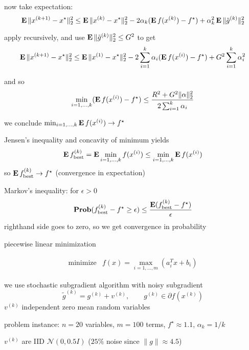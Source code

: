 \documentclass[dvips,landscape]{foils}
\renewcommand{\oursection}[1]{
\foilhead[-1.0cm]{#1}
}
\begin{document}
\newpage
now take expectation:
\[
\mathop{\bf E{}} \|x^{(k+1)}-x^\star\|_2^2
\leq \mathop{\bf E{}} \|x^{(k)}-x^\star\|_2^2
            -2\alpha_k (\mathop{\bf E{}} f(x^{(k)})-f^\star)
            +\alpha_k^2 \mathop{\bf E{}} \|\tilde g^{(k)}\|_2^2
\]

apply recursively, and use $\mathop{\bf E{}} \|\tilde g^{(k)}\|_2^2 \leq G^2$
to get
\[
\mathop{\bf E{}} \|x^{(k+1)}-x^\star\|_2^2 \leq
\mathop{\bf E{}}\|x^{(1)}-x^\star\|_2^2
-2\sum_{i=1}^k \alpha_i  (\mathop{\bf E{}} f(x^{(i)})-f^\star)
+G^2\sum_{i=1}^k \alpha_i^2
\]

and so
\[
\min_{i=1,\ldots,k} (\mathop{\bf E{}} f(x^{(i)})-f^\star) \leq
\frac{R^2+G^2\|\alpha\|_2^2}{2 \sum_{i=1}^k \alpha_i}
\]

\newpage
\BIT
\item we conclude
$ \min_{i=1,\ldots,k} \mathop{\bf E{}} f(x^{(i)}) \rightarrow f^\star $

\item
Jensen's inequality and concavity of minimum yields
\[
\mathop{\bf E{}} f^{(k)}_\mathrm{best}
= \mathop{\bf E{}} \min_{i=1,\ldots,k} f(x^{(i)})
\leq \min_{i=1,\ldots,k} \mathop{\bf E{}} f(x^{(i)})
\]
so $\mathop{\bf E{}} f^{(k)}_\mathrm{best} \rightarrow f^\star$
(convergence in expectation)

\item
Markov's inequality: for $\epsilon>0$
\[
\mathop{\bf Prob}(f^{(k)}_\mathrm{best} - f^\star \geq \epsilon) \leq
\frac{\mathop{\bf E{}} (f^{(k)}_\mathrm{best} - f^\star)}{\epsilon}
\]
righthand side goes to zero, so we get convergence in probability
\EIT

\oursection{Example}
piecewise linear minimization

\[
\begin{array}{ll} \mbox{minimize} &
f(x) = \max_{i=1,\ldots,m} (a_i^T x + b_i)
\end{array}
\]

we use stochastic subgradient algorithm with noisy subgradient
\[
\tilde g^{(k)} = g^{(k)} + v^{(k)}, \qquad
g^{(k)}\in \partial f(x^{(k)})
\]
$v^{(k)}$ independent zero mean random variables

\vfill

\newpage
problem instance: $n=20$ variables, $m=100$ terms,
$f^\star \approx 1.1$, $\alpha_k=1/k$

$v^{(k)}$ are IID $\mathcal N(0,0.5I)$ ($25\%$ noise
since $ \|g \| \approx 4.5$)

\vfill
\end{document}
